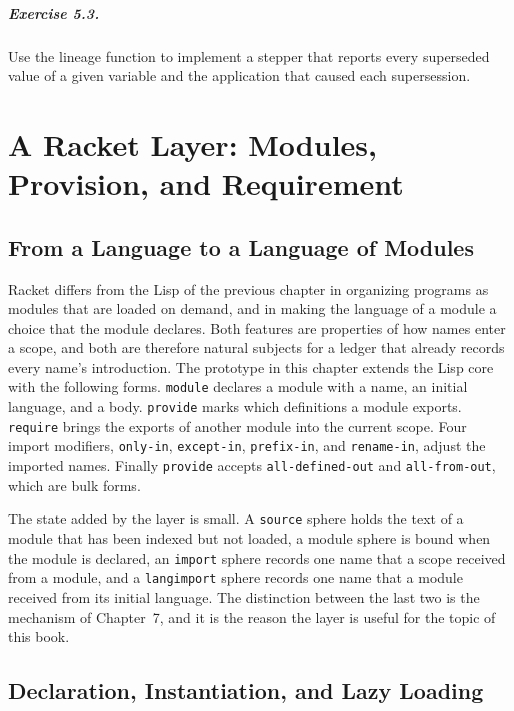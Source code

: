 \paragraph{Exercise 5.3.} Use the lineage function to implement a stepper that reports every superseded value of a given variable and the application that caused each supersession.

\chapter{A Racket Layer: Modules, Provision, and Requirement}

\section{From a Language to a Language of Modules}

Racket \cite{racket-ref,flatt02} differs from the Lisp of the previous chapter in organizing programs as modules that are loaded on demand, and in making the language of a module a choice that the module declares. Both features are properties of how names enter a scope, and both are therefore natural subjects for a ledger that already records every name's introduction. The prototype in this chapter extends the Lisp core with the following forms. \texttt{module} declares a module with a name, an initial language, and a body. \texttt{provide} marks which definitions a module exports. \texttt{require} brings the exports of another module into the current scope. Four import modifiers, \texttt{only-in}, \texttt{except-in}, \texttt{prefix-in}, and \texttt{rename-in}, adjust the imported names. Finally \texttt{provide} accepts \texttt{all-defined-out} and \texttt{all-from-out}, which are bulk forms.

The state added by the layer is small. A \texttt{source} sphere holds the text of a module that has been indexed but not loaded, a module sphere is bound when the module is declared, an \texttt{import} sphere records one name that a scope received from a module, and a \texttt{langimport} sphere records one name that a module received from its initial language. The distinction between the last two is the mechanism of Chapter~7, and it is the reason the layer is useful for the topic of this book.

\section{Declaration, Instantiation, and Lazy Loading}


